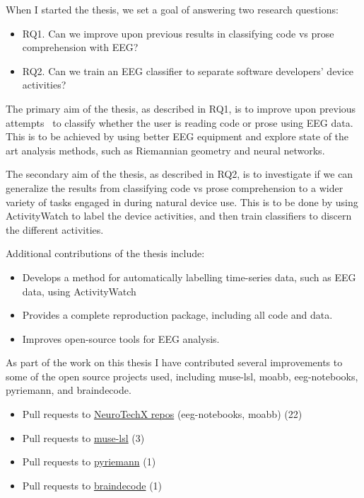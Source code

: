     When I started the thesis, we set a goal of answering two research questions:

    \begin{itemize}
            \item RQ1. Can we improve upon previous results in classifying code vs prose comprehension with EEG\@?
            \item RQ2. Can we train an EEG classifier to separate software developers’ device activities?
    \end{itemize}

    The primary aim of the thesis, as described in RQ1, is to improve upon previous attempts~\cite{fucci_replication_2019} to classify whether the user is reading code or prose using EEG data. This is to be achieved by using better EEG equipment and explore state of the art analysis methods, such as Riemannian geometry and neural networks.

    The secondary aim of the thesis, as described in RQ2, is to investigate if we can generalize the results from classifying code vs prose comprehension to a wider variety of tasks engaged in during natural device use. This is to be done by using ActivityWatch to label the device activities, and then train classifiers to discern the different activities.

    Additional contributions of the thesis include:

    \begin{itemize}
        \item Develops a method for automatically labelling time-series data, such as EEG data, using ActivityWatch
        \item Provides a complete reproduction package, including all code and data.
        \item Improves open-source tools for EEG analysis.
    \end{itemize}

    As part of the work on this thesis I have contributed several improvements to some of the open source projects used, including muse-lsl, moabb, eeg-notebooks, pyriemann, and braindecode.

    \begin{itemize}
        \item Pull requests to \href{%
                https://github.com/search?q=org%
            }{NeuroTechX repos} (eeg-notebooks, moabb) (22)
        \item Pull requests to \href{%
                https://github.com/search?q=org%
            }{muse-lsl} (3)
        \item Pull requests to \href{%
                https://github.com/search?q=org%
            }{pyriemann} (1)
        \item Pull requests to \href{%
                https://github.com/search?q=org%
            }{braindecode} (1)
    \end{itemize}

